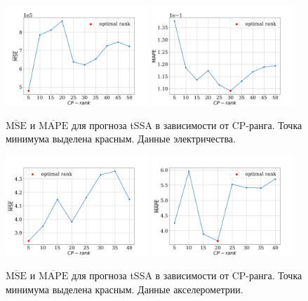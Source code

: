 			\begin{figure}[h]
				\centering
				\includegraphics[width=0.48\textwidth, keepaspectratio]{../experiments/electricity/tssa/figs/prediction/MSE_rank.png}
				\includegraphics[width=0.48\textwidth, keepaspectratio]{../experiments/electricity/tssa/figs/prediction/MAPE_rank.png}
				\caption{$ \overline{\text{MSE}} $ и $ \overline{\text{MAPE}} $ для прогноза tSSA в зависимости от CP-ранга. Точка минимума выделена красным. Данные электричества.}\label{fig:mse_mape_electr}
			\end{figure}
			
			\begin{figure}[h]
				\centering
				\includegraphics[width=0.48\textwidth, keepaspectratio]{../experiments/motion_1/tssa/figs/prediction/MSE_rank.png}
				\includegraphics[width=0.48\textwidth, keepaspectratio]{../experiments/motion_1/tssa/figs/prediction/MAPE_rank.png}
				\caption{$ \overline{\text{MSE}} $ и $ \overline{\text{MAPE}} $ для прогноза tSSA в зависимости от CP-ранга. Точка минимума выделена красным. Данные акселерометрии.}\label{fig:mse_mape_motion}
			\end{figure}
			
